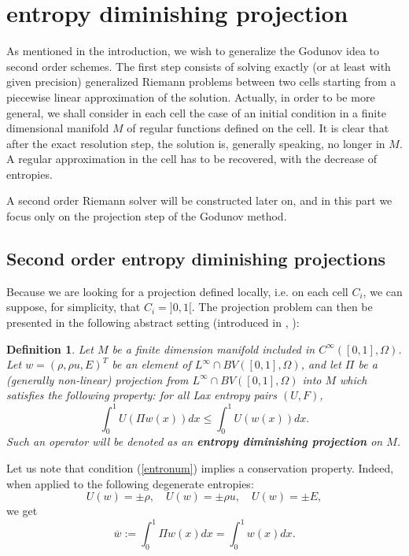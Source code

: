 \documentclass{fldauth}
\theoremstyle{plain}
\theoremstyle{plain}
\theoremstyle{plain}
\theoremstyle{plain}
\newtheorem{defn}{Definition}
\theoremstyle{plain}
\theoremstyle{plain}
\begin{document}
\section{entropy diminishing projection}

As mentioned in the introduction, we wish to generalize the Godunov idea to
second order schemes. The first step consists of solving exactly (or at least
with given precision) generalized Riemann problems between two cells starting
from a piecewise linear approximation of the solution. Actually, in order to
be more general, we shall consider in each cell the case of an initial condition
in a finite dimensional manifold \( M \) of regular functions defined on the
cell. It is clear that after the exact resolution step, the solution is, generally
speaking, no longer in \( M \). A regular approximation in the cell has to
be recovered, with the decrease of entropies.

A second order Riemann solver will be constructed later on, and in this part
we focus only on the projection step of the Godunov method.


\subsection{Second order entropy diminishing projections}

Because we are looking for a projection defined locally, i.e. on each cell \( C_{i} \),
we can suppose, for simplicity, that \( C_{i}=]0,1[ \). The projection problem
can then be presented in the following abstract setting (introduced in \cite{bouchut_pertham93},
\cite{coquel_lefloch95}):

\begin{defn}
Let \( M \) be a finite dimension manifold included in \( C^{\infty }([0,1],\Omega ) \).
Let \( w=(\rho ,\rho u,E)^{T} \) be an element of \( L^{\infty }\cap BV([0,1],\Omega ) \),
and let \( \Pi  \) be a (generally non-linear) projection from \( L^{\infty }\cap BV([0,1],\Omega ) \)
into \( M \) which satisfies the following property: for all Lax entropy pairs
\( (U,F) \),
\begin{equation}
\label{entronum}
\int ^{1}_{0}U(\Pi w(x))dx\leq \int ^{1}_{0}U(w(x))dx.
\end{equation}
 Such an operator will be denoted as an \textbf{entropy diminishing projection}
on \( M \).
\end{defn}
Let us note that condition (\ref{entronum}) implies a conservation property.
Indeed, when applied to the following degenerate entropies:
\[
U(w)=\pm \rho ,\quad U(w)=\pm \rho u,\quad U(w)=\pm E,\]
we get
\[
\overline{w}:=\int ^{1}_{0}\Pi w(x)dx=\int ^{1}_{0}w(x)dx.\]
\end{document}
